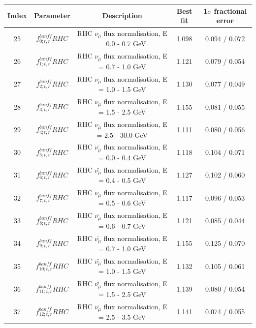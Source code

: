 {\begin{table}
\end{table}




\begin{table}
\centering
\begin{tabular}{| c | c | c | c | c |}
\hline
         Index  &Parameter & Description & Best fit & 1$\sigma$ fractional error \\
\hline

25 & $f_{0; t, r}^{banff} RHC$  & RHC $\nu_\mu$ flux normalisation, E = 0.0 - 0.7 GeV         & 1.098   & 0.094 / 0.072 \\  
26 & $f_{1; t, r}^{banff} RHC$  & RHC $\nu_\mu$ flux normalisation, E = 0.7 - 1.0 GeV         & 1.121   & 0.079 / 0.054 \\  
27 & $f_{2; t, r}^{banff} RHC$  & RHC $\nu_\mu$ flux normalisation, E = 1.0 - 1.5 GeV         & 1.130   & 0.077 / 0.049 \\  
28 & $f_{3; t, r}^{banff} RHC$  & RHC $\nu_\mu$ flux normalisation, E = 1.5 - 2.5 GeV         & 1.155   & 0.081 / 0.055 \\  
29 & $f_{4; t, r}^{banff} RHC$  & RHC $\nu_\mu$ flux normalisation, E = 2.5 - 30.0 GeV        & 1.111   & 0.080 / 0.056 \\  
30 & $f_{5; t, r}^{banff} RHC$  & RHC $\bar{\nu_\mu}$ flux normalisation, E = 0.0 - 0.4 GeV   & 1.118   & 0.104 / 0.071 \\  
31 & $f_{6; t, r}^{banff} RHC$  & RHC $\bar{\nu_\mu}$ flux normalisation, E = 0.4 - 0.5 GeV   & 1.127   & 0.102 / 0.060 \\  
32 & $f_{7; t, r}^{banff} RHC$  & RHC $\bar{\nu_\mu}$ flux normalisation, E = 0.5 - 0.6 GeV   & 1.117   & 0.096 / 0.053 \\  
33 & $f_{8; t, r}^{banff} RHC$  & RHC $\bar{\nu_\mu}$ flux normalisation, E = 0.6 - 0.7 GeV   & 1.121   & 0.085 / 0.044 \\  
34 & $f_{9; t, r}^{banff} RHC$  & RHC $\bar{\nu_\mu}$ flux normalisation, E = 0.7 - 1.0 GeV   & 1.155   & 0.125 / 0.070 \\  
35 & $f_{10; t, r}^{banff} RHC$ & RHC $\bar{\nu_\mu}$ flux normalisation, E = 1.0 - 1.5 GeV   & 1.132   & 0.105 / 0.061 \\  
36 & $f_{11; t, r}^{banff} RHC$ & RHC $\bar{\nu_\mu}$ flux normalisation, E = 1.5 - 2.5 GeV   & 1.139   & 0.080 / 0.054 \\  
37 & $f_{12; t, r}^{banff} RHC$ & RHC $\bar{\nu_\mu}$ flux normalisation, E = 2.5 - 3.5 GeV   & 1.141   & 0.074 / 0.055 \\  

\end{tabular}
\end{table}}
